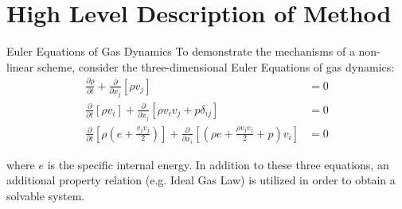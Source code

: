\documentclass[10pt]{beamer}
\begin{document}



\section{High Level Description of Method}

\begin{frame}{Euler Equations of Gas Dynamics}
To demonstrate the mechanisms of a non-linear scheme, consider the three-dimensional Euler Equations of gas dynamics:
\begin{align}
\frac{\partial \rho}{\partial t}+\frac{\partial}{\partial x_j}[\rho v_j] &=0\label{eq:MassBalance}\\
\frac{\partial}{\partial t}[\rho v_i]+\frac{\partial}{\partial x_j}[\rho v_iv_j+p\delta_{ij}]&=0\label{eq:MomentaBalance}\\
\frac{\partial}{\partial t}[\rho(e+\tfrac{v_jv_j}{2})]+\frac{\partial}{\partial x_i}[(\rho e+\tfrac{\rho v_jv_j}{2} +p)v_i]&=0\label{eq:EnergyBalance}
\end{align}

where $e$ is the specific internal energy. In addition to these three equations, an additional property relation (e.g. Ideal Gas Law) is utilized in order to obtain a solvable system. 
\end{frame}
\end{document}
